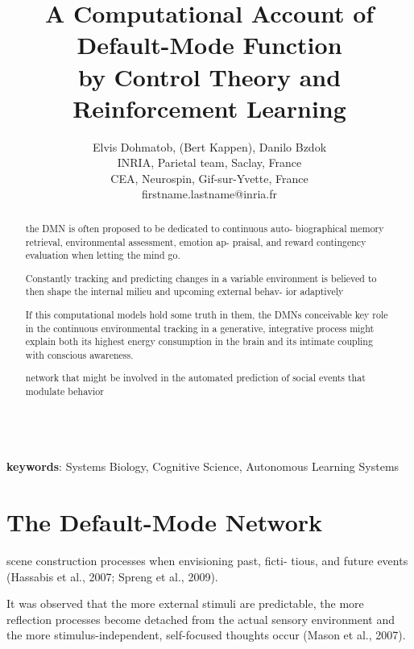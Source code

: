 \documentclass{article} %
\title{A Computational Account of Default-Mode Function\\by Control Theory and Reinforcement Learning}
\begin{document}
\author{Elvis Dohmatob, (Bert Kappen), Danilo Bzdok\\
  INRIA, Parietal team, Saclay, France\\
  CEA, Neurospin, Gif-sur-Yvette, France\\
  firstname.lastname@inria.fr}

\maketitle


\begin{abstract}

the DMN is often proposed to be dedicated to continuous auto- biographical memory retrieval, environmental assessment, emotion ap- praisal, and reward contingency evaluation when letting the mind go.

Constantly tracking and predicting changes in a variable environment is believed to then shape the internal milieu and upcoming external behav- ior adaptively


If this computational models hold some truth in them, the DMNs conceivable key role in the continuous environmental tracking in a generative, integrative process might explain both its highest energy consumption in the brain and its intimate coupling with conscious awareness.

network that might be involved in the automated prediction of social events that modulate behavior

\end{abstract}

\textbf{\\keywords}: Systems Biology, Cognitive Science, Autonomous Learning Systems

\tableofcontents

\section{The Default-Mode Network}
%
scene construction processes when envisioning past, ficti- tious, and future events (Hassabis et al., 2007; Spreng et al., 2009).

It was observed that the more external stimuli are predictable, the more reflection processes become detached from the actual sensory environment and the more stimulus-independent, self-focused thoughts occur (Mason et al., 2007).
\end{document}
